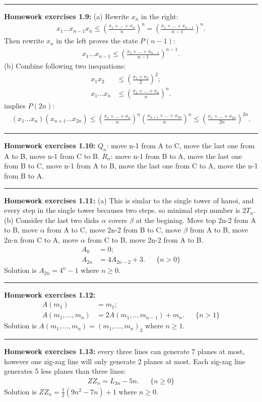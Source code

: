 \documentclass{article}
\begin{document}
\noindent\rule{\textwidth}{0.4pt}
\textbf{Homework exercises 1.9:}
(a) Rewrite $x_n$ in the right:
\begin{align}
x_1...x_{n-1}x_n \le (\frac{x_1+...+x_n}{n})^n = (\frac{x_1+...+x_{n-1}}{n-1})^n.
\end{align}
Then rewrite $x_n$ in the left proves the state $P(n-1)$:
\begin{align}
x_1...x_{n-1} \le (\frac{x_1+...+x_{n-1}}{n-1})^{n-1}.
\end{align}
(b) Combine following two inequations:
\begin{align}
x_1x_{2} & \le (\frac{x_1+x_2}{2})^2;\\
x_1...x_{n} & \le (\frac{x_1+...+x_{n}}{n})^n.
\end{align}
implies $P(2n)$:
\begin{align}
(x_1...x_{n})(x_{n+1}...x_{2n}) \le  (\frac{x_1+...+x_{n}}{n})^n (\frac{x_{n+1}+...+x_{2n}}{n})^n \le (\frac{x_1+...+x_{2n}}{2n})^{2n}.
\end{align}

\noindent\rule{\textwidth}{0.4pt}
\textbf{Homework exercises 1.10:}
$Q_n$: move n-1 from A to C, move the last one from A to B, move n-1 from C to B.
$R_n$: move n-1 from B to A, move the last one from B to C, move n-1 from A to B, move the last one from C to A, move the n-1 from B to A.

\noindent\rule{\textwidth}{0.4pt}
\textbf{Homework exercises 1.11:}
(a) This is simlar to the single tower of hanoi, and every step in the single tower becauses two steps. so minimal step number is $2T_n$.
(b) Consider the last two disks $\alpha$ covers $\beta$ at the begining.
Move top 2n-2 from A to B, move $\alpha$ from A to C, move 2n-2 from B to C, move $\beta$ from A to B, move 2n-n from C to A, move $\alpha$ from C to B, move 2n-2 from A to B.
\begin{align}
A_0 & = 0;\\
A_{2n} & = 4A_{2n-2}+3. && \{n>0\}
\end{align}
Solution is $A_{2n} = 4^n - 1$ where $n \ge 0$.

\noindent\rule{\textwidth}{0.4pt}
\textbf{Homework exercises 1.12:}
\begin{align}
A(m_1) &= m_1;\\
A(m_1,...,m_n) &= 2A(m_1,..,m_{n-1}) + m_n. && \{n>1\}
\end{align}
Solution is $A(m_1,...,m_n) = (m_1,...,m_n)_2$ where $n \ge 1$.

\noindent\rule{\textwidth}{0.4pt}
\textbf{Homework exercises 1.13:}
every three lines can generate 7 planes at most, however one zig-zag line will only generate 2 planes at most.
Each zig-zag line generates 5 less planes than three lines:
\begin{align}
ZZ_{n} = L_{3n} - 5n. && \{n\ge0\}
\end{align}
Solution is $ZZ_n = \frac{1}{2}(9n^2 - 7n)+1$ where $n\ge 0$.
\end{document}
